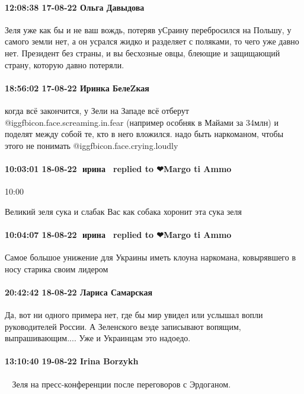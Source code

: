 \paragraph{12:08:38 17-08-22 Ольга Давыдова}

Зеля уже как бы и не ваш вождь, потеряв уСраину перебросился на Польшу, у
самого земли нет, а он усрался жидко и разделяет с поляками, то чего уже давно
нет. Президент без страны, и вы бесхозные овцы, блеющие и защищающий страну,
которую давно потеряли.

\paragraph{18:56:02 17-08-22 Иринка БелеZкая}

когда всё закончится, у Зели на Западе всё отберут  @igg{fbicon.face.screaming.in.fear} (например особняк в Майами
за 34млн) и поделят между собой те, кто в него вложился. надо быть наркоманом,
чтобы этого не понимать  @igg{fbicon.face.crying.loudly} 

\paragraph{10:03:01 18-08-22 🍏ирина 🍇🍇replied to ❤Margo ti Ammo}
10:00

Великий зеля сука и слабак
Вас как собака хоронит эта сука зеля

\paragraph{10:04:07 18-08-22 🍏ирина 🍇🍇replied to ❤Margo ti Ammo}

Самое большое унижение для Украины иметь клоуна наркомана, ковырявшего в носу
старика своим лидером

\paragraph{20:42:42 18-08-22 Лариса Самарская}

Да, вот ни одного примера нет, где бы мир увидел или услышал вопли
руководителей России.
А Зеленского везде записывают вопящим, выпрашивающим....
Уже и Украинцам это надоедо.

\paragraph{13:10:40 19-08-22 Irina Borzykh}

🧂🥥 Зеля на пресс-конференции после переговоров с Эрдоганом.

